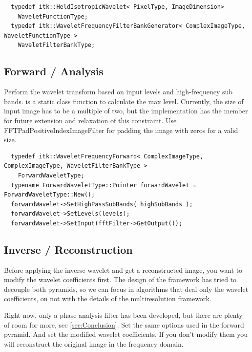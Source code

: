 \begin{verbatim}
  typedef itk::HeldIsotropicWavelet< PixelType, ImageDimension>
    WaveletFunctionType;
  typedef itk::WaveletFrequencyFilterBankGenerator< ComplexImageType, WaveletFunctionType >
    WaveletFilterBankType;
\end{verbatim}

\subsection{Forward / Analysis}
\label{sub:Forward}
Perform the wavelet transform based on input levels and high-frequency sub bands.
 is a static class function to calculate the max level.
Currently, the size of input image has to be a multiple of two, but the implementation has the member  for future extension and relaxation of this constraint. Use FFTPadPositiveIndexImageFilter for padding the image with zeros for a valid size.

\begin{verbatim}
  typedef itk::WaveletFrequencyForward< ComplexImageType, ComplexImageType, WaveletFilterBankType >
    ForwardWaveletType;
  typename ForwardWaveletType::Pointer forwardWavelet = ForwardWaveletType::New();
  forwardWavelet->SetHighPassSubBands( highSubBands );
  forwardWavelet->SetLevels(levels);
  forwardWavelet->SetInput(fftFilter->GetOutput());
\end{verbatim}

\subsection{Inverse / Reconstruction}
\label{sub:Inverse}
Before applying the inverse wavelet and get a reconstructed image, you want to modify the wavelet coefficients first. The design of the framework has tried to decouple both pyramids, so we can focus in algorithms that deal only the wavelet coefficients, on not with the details of the multiresolution framework.\par
Right now, only a phase analysis filter has been developed, but there are plenty of room for more, see \autoref{sec:Conclusion}.
Set the same options used in the forward pyramid. And set the modified wavelet coefficients. If you don't modify them you will reconstruct the original image in the frequency domain.

